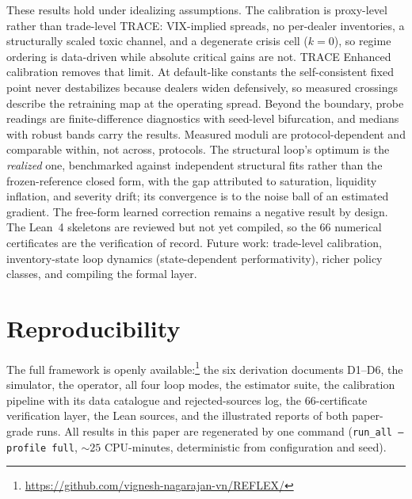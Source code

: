 \documentclass[sigconf]{acmart}
\newcommand{\code}[1]{\texttt{#1}}
\begin{document}
These results hold under idealizing assumptions. The calibration is
proxy-level rather than trade-level TRACE: VIX-implied spreads, no
per-dealer inventories, a structurally scaled toxic channel, and a
degenerate crisis cell ($k=0$), so regime ordering is data-driven while
absolute critical gains are not. TRACE Enhanced calibration removes that
limit. At default-like constants the self-consistent fixed point never
destabilizes because dealers widen defensively, so measured crossings
describe the retraining map at the operating spread. Beyond the boundary,
probe readings are finite-difference diagnostics with seed-level
bifurcation, and medians with robust bands carry the results. Measured
moduli are protocol-dependent and comparable within, not across, protocols.
The structural loop's optimum is the \emph{realized} one, benchmarked
against independent structural fits rather than the frozen-reference closed
form, with the gap attributed to saturation, liquidity inflation, and
severity drift; its convergence is to the noise ball of an estimated
gradient. The free-form learned correction remains a negative result by
design. The Lean~4 skeletons are reviewed but not yet compiled, so the 66
numerical certificates are the verification of record. Future work:
trade-level calibration, inventory-state loop dynamics (state-dependent
performativity), richer policy classes, and compiling the formal layer.

\section*{Reproducibility}
\label{sec:repro}
The full framework is openly available:\footnote{%
\url{https://github.com/vignesh-nagarajan-vn/REFLEX/}}
the six derivation documents D1--D6, the simulator, the operator, all four
loop modes, the estimator suite, the calibration pipeline with its data
catalogue and rejected-sources log, the 66-certificate verification layer,
the Lean sources, and the illustrated reports of both paper-grade runs.
All results in this paper are regenerated by one command
(\code{run\_all --profile full}, ${\sim}25$ CPU-minutes, deterministic from
configuration and seed).



\end{document}
